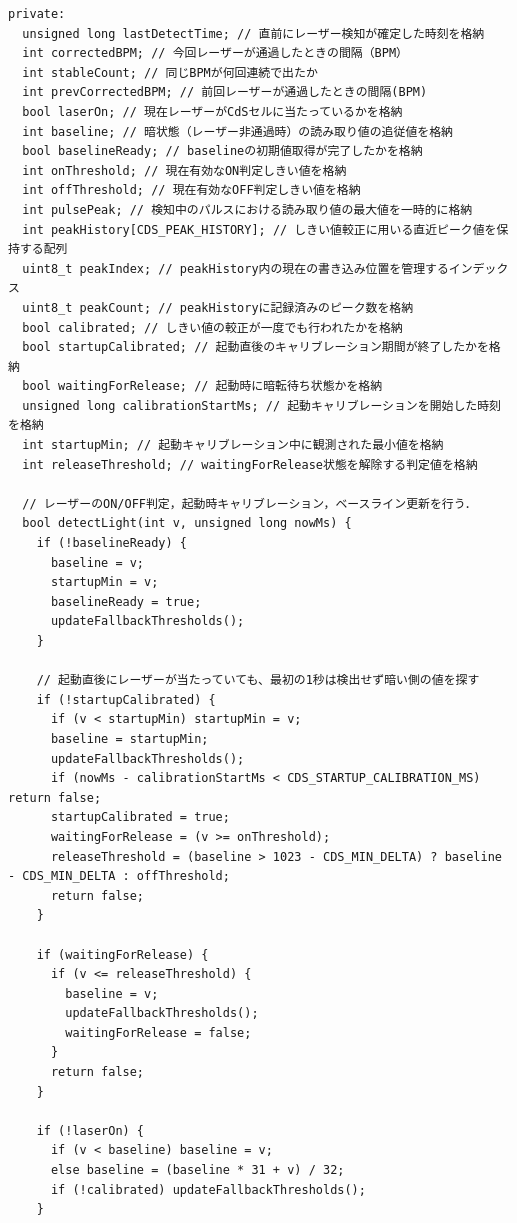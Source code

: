 \begin{lstlisting}[caption={drum\_0706.ino（楽譜データは冒頭2小節のみ掲載）}, label={lst:douki_drum_full}]
private:
  unsigned long lastDetectTime; // 直前にレーザー検知が確定した時刻を格納
  int correctedBPM; // 今回レーザーが通過したときの間隔（BPM）
  int stableCount; // 同じBPMが何回連続で出たか
  int prevCorrectedBPM; // 前回レーザーが通過したときの間隔(BPM)
  bool laserOn; // 現在レーザーがCdSセルに当たっているかを格納
  int baseline; // 暗状態（レーザー非通過時）の読み取り値の追従値を格納
  bool baselineReady; // baselineの初期値取得が完了したかを格納
  int onThreshold; // 現在有効なON判定しきい値を格納
  int offThreshold; // 現在有効なOFF判定しきい値を格納
  int pulsePeak; // 検知中のパルスにおける読み取り値の最大値を一時的に格納
  int peakHistory[CDS_PEAK_HISTORY]; // しきい値較正に用いる直近ピーク値を保持する配列
  uint8_t peakIndex; // peakHistory内の現在の書き込み位置を管理するインデックス
  uint8_t peakCount; // peakHistoryに記録済みのピーク数を格納
  bool calibrated; // しきい値の較正が一度でも行われたかを格納
  bool startupCalibrated; // 起動直後のキャリブレーション期間が終了したかを格納
  bool waitingForRelease; // 起動時に暗転待ち状態かを格納
  unsigned long calibrationStartMs; // 起動キャリブレーションを開始した時刻を格納
  int startupMin; // 起動キャリブレーション中に観測された最小値を格納
  int releaseThreshold; // waitingForRelease状態を解除する判定値を格納

  // レーザーのON/OFF判定，起動時キャリブレーション，ベースライン更新を行う．
  bool detectLight(int v, unsigned long nowMs) {
    if (!baselineReady) {
      baseline = v;
      startupMin = v;
      baselineReady = true;
      updateFallbackThresholds();
    }

    // 起動直後にレーザーが当たっていても、最初の1秒は検出せず暗い側の値を探す
    if (!startupCalibrated) {
      if (v < startupMin) startupMin = v;
      baseline = startupMin;
      updateFallbackThresholds();
      if (nowMs - calibrationStartMs < CDS_STARTUP_CALIBRATION_MS) return false;
      startupCalibrated = true;
      waitingForRelease = (v >= onThreshold);
      releaseThreshold = (baseline > 1023 - CDS_MIN_DELTA) ? baseline - CDS_MIN_DELTA : offThreshold;
      return false;
    }

    if (waitingForRelease) {
      if (v <= releaseThreshold) {
        baseline = v;
        updateFallbackThresholds();
        waitingForRelease = false;
      }
      return false;
    }

    if (!laserOn) {
      if (v < baseline) baseline = v;
      else baseline = (baseline * 31 + v) / 32;
      if (!calibrated) updateFallbackThresholds();
    }


\end{lstlisting}
